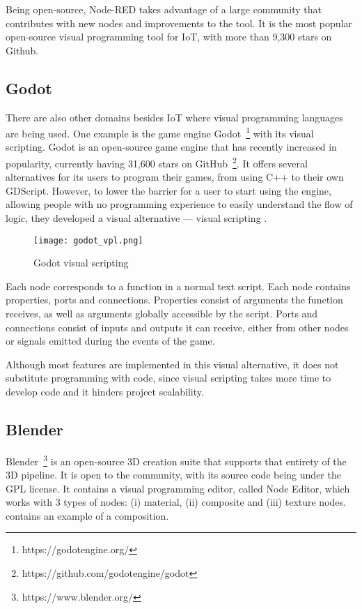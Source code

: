 Being open-source, Node-RED takes advantage of a large community that contributes with new nodes and improvements to the tool. It is the most popular open-source visual programming tool for IoT, with more than 9,300 stars on Github.

\subsection{Godot}\label{sec:godot}

There are also other domains besides IoT where visual programming languages are being used. One example is the game engine Godot~\footnote{https://godotengine.org/} with its visual scripting. Godot is an open-source game engine that has recently increased in popularity, currently having 31,600 stars on GitHub~\footnote{https://github.com/godotengine/godot}. It offers several alternatives for its users to program their games, from using C++ to their own GDScript. However, to lower the barrier for a user to start using the engine, allowing people with no programming experience to easily understand the flow of logic, they developed a visual alternative --- visual scripting .

\begin{figure}[!ht]
\centering
\texttt{[image: godot\_vpl.png]}
\caption[Godot visual scripting]{Godot visual scripting~\cite{godot_image}}
\label{fig:godot}
\end{figure}

Each node corresponds to a function in a normal text script. Each node contains properties, ports and connections. Properties consist of arguments the function receives, as well as arguments globally accessible by the script. Ports and connections consist of inputs and outputs it can receive, either from other nodes or signals emitted during the events of the game.

Although most features are implemented in this visual alternative, it does not substitute programming with code, since visual scripting takes more time to develop code and it hinders project scalability.

\subsection{Blender}\label{sec:blender}

Blender~\footnote{https://www.blender.org/} is an open-source 3D creation suite that supports that entirety of the 3D pipeline. It is open to the community, with its source code being under the GPL license. It contains a visual programming editor, called Node Editor, which works with 3 types of nodes: (i) material, (ii) composite and (iii) texture nodes.  contains an example of a composition.

